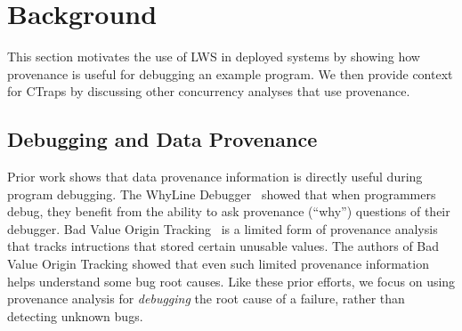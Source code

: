 \documentclass[pageno,nohyperref]{jpaper}
\newcommand{\ctraps}{CTraps\xspace}
\newcommand{\lws}{LWS\xspace}
\begin{document}


\section{Background}

This section motivates the use of \lws in deployed systems by showing how
provenance is useful for debugging an example program.  We then provide context
for \ctraps by discussing other concurrency analyses that use provenance.


\subsection{Debugging and Data Provenance}

Prior work shows that data provenance information is directly useful during
program debugging.  The WhyLine Debugger~\cite{whylinechi,whylineicse} showed
that when programmers debug, they benefit from the ability to ask provenance
(``why'') questions of their debugger.  Bad Value Origin
Tracking~\cite{badapples} is a limited form of provenance analysis that tracks
intructions that stored certain unusable values.  The authors of Bad Value
Origin Tracking showed that even such limited provenance information helps
understand some bug root causes. Like these prior efforts, we focus on using
provenance analysis for {\em debugging} the root cause of a
failure, rather than detecting unknown bugs.
\end{document}
